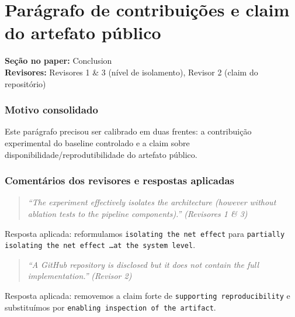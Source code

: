 \documentclass[11pt,a4paper]{article}
\begin{document}
\section{Parágrafo de contribuições e claim do artefato público}

\textbf{Seção no paper:} Conclusion\\
\textbf{Revisores:} Revisores 1 \& 3 (nível de isolamento), Revisor 2 (claim do repositório)

\subsubsection*{Motivo consolidado}

Este parágrafo precisou ser calibrado em duas frentes: a contribuição experimental do baseline controlado e a claim sobre disponibilidade/reprodutibilidade do artefato público.

\subsubsection*{Comentários dos revisores e respostas aplicadas}

\begin{quote}
\textit{``The experiment effectively isolates the architecture (however without ablation tests to the pipeline components).''}
\hfill\textit{(Revisores 1 \& 3)}
\end{quote}

\noindent Resposta aplicada: reformulamos \texttt{isolating the net effect} para \texttt{partially isolating the net effect \ldots at the system level}.

\begin{quote}
\textit{``A GitHub repository is disclosed but it does not contain the full implementation.''}
\hfill\textit{(Revisor 2)}
\end{quote}

\noindent Resposta aplicada: removemos a claim forte de \texttt{supporting reproducibility} e substituímos por \texttt{enabling inspection of the artifact}.
\end{document}
